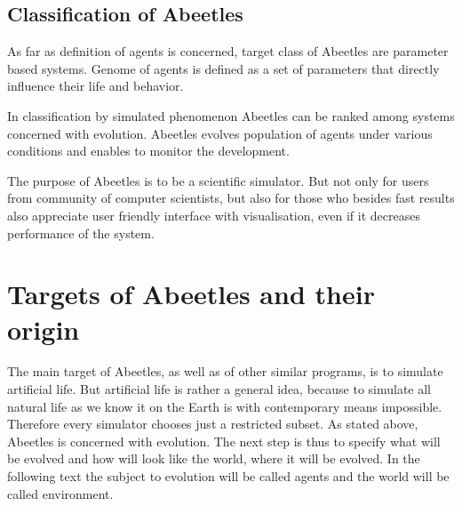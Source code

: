 \documentclass[a4paper,12pt]{report}
\begin{document}
\section{Classification of Abeetles}
As far as definition of agents is concerned, target class of Abeetles are parameter based systems. Genome of agents is defined as a set of parameters that  directly influence their life and behavior.

In classification by simulated phenomenon Abeetles can be ranked among systems concerned with evolution. Abeetles evolves population of agents under various conditions and enables to monitor the development.

The purpose of Abeetles is to be a scientific simulator. But not only for users from community of computer scientists, but also for those who besides fast results also appreciate user friendly interface with visualisation, even if it decreases performance of the system. 


\chapter{Targets of Abeetles and their origin}



The main target of Abeetles, as well as of other similar programs, is to simulate artificial life. But artificial life is rather a general idea, because to simulate all natural life as we know it on the Earth is with contemporary means impossible. Therefore every simulator chooses just a restricted subset. As stated above, Abeetles is concerned with evolution. The next step is thus to specify what will be evolved and how will look like the world, where it will be evolved. In the following text the subject to evolution will be called agents and the world will be called environment. 
\end{document}
